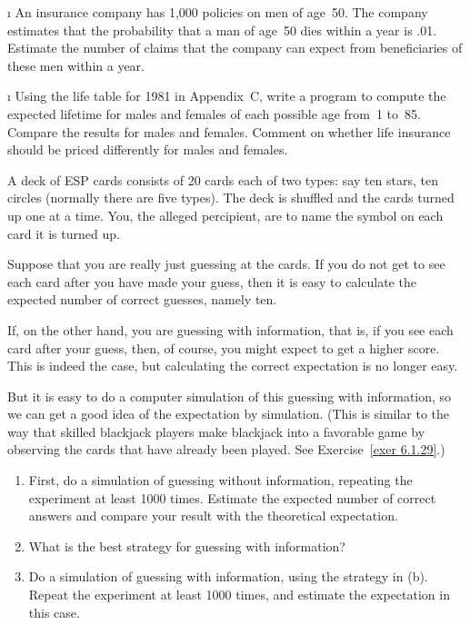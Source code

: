 \begin{LJSItem}
\i\label{exer 6.1.23} An insurance company has 1{,}000 policies on men of age~50. 
The company estimates that the probability that a man of age~50 dies within a year is
.01.  Estimate the number of claims that the company can expect from beneficiaries of
these men within a year.

\i\label{exer 6.1.24} Using the life table for 1981 in Appendix~C, write
a program to compute the expected lifetime for males and females of each possible age
from~1 to~85.  Compare the results for males and females.  Comment on whether life
insurance should be priced differently for males and females.

\istar\label{exer 6.1.25} A deck of ESP cards consists of 20 cards each of two types:
say ten stars, ten circles (normally there are five types).  The deck is shuffled and
the cards turned up one at a time.  You, the alleged percipient, are to name the
symbol on each card  it is turned up.
\par
Suppose that you are really just guessing at the cards.  If you do not get to see
each card after you have made your guess, then it is easy to calculate the expected
number of correct guesses, namely ten.
\par
If, on the other hand, you are guessing with information, that is, if you see each
card after your guess, then, of course, you might expect to get a higher score.  This
is indeed the case, but calculating the correct expectation is no longer easy.
\par
But it is easy to do a computer simulation of this guessing with information, so we
can get a good idea of the expectation by simulation.  (This is similar to the way
that skilled blackjack players make blackjack into a favorable game by observing the
cards that have already been played.  See Exercise~\ref{exer 6.1.29}.)

\begin{enumerate}
\item First, do a simulation of guessing without information, repeating the
experiment at least 1000 times.  Estimate the expected number of correct answers and
compare your result with the theoretical expectation.

\item What is the best strategy for guessing with information?

\item Do a simulation of guessing with information, using the strategy in (b). 
Repeat the experiment at least 1000 times, and estimate the expectation in this case.


\end{enumerate}
\end{LJSItem}
